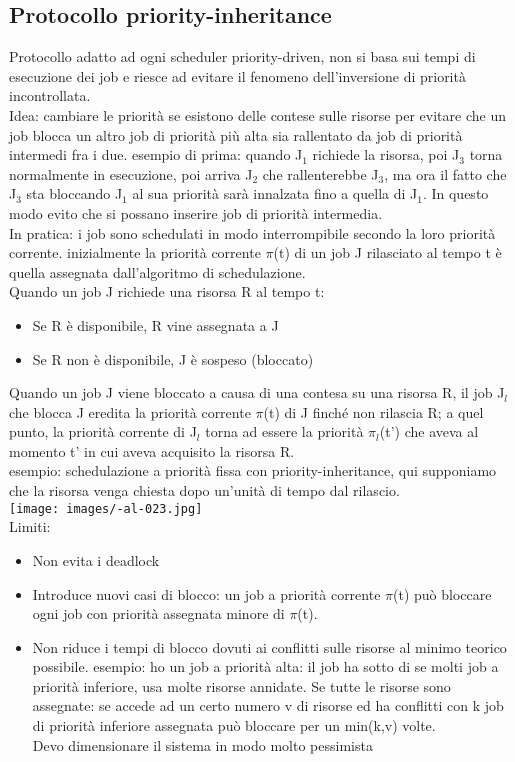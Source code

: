 \documentclass{article}
\begin{document}
\subsection{Protocollo priority-inheritance}
Protocollo adatto ad ogni scheduler priority-driven, non si basa sui tempi di esecuzione dei job e riesce ad evitare il fenomeno dell'inversione di priorità incontrollata.\\ Idea: cambiare le priorità se esistono delle contese sulle risorse per evitare che un job blocca un altro job di priorità più alta sia rallentato da job di priorità intermedi fra i due. esempio di prima: quando J$_{1}$ richiede la risorsa, poi J$_{3}$ torna normalmente in esecuzione, poi arriva J$_{2}$ che rallenterebbe J$_{3}$, ma ora il fatto che J$_{3}$ sta bloccando J$_{1}$ al sua priorità sarà innalzata fino a quella di J$_{1}$. In questo modo evito che si possano inserire job di priorità intermedia.\\ In pratica: i job sono schedulati in modo interrompibile secondo la loro priorità corrente. inizialmente la priorità corrente $\pi$(t) di un job J rilasciato al tempo t è quella assegnata dall'algoritmo di schedulazione.\\ Quando un job J richiede una risorsa R al tempo t:
\begin{itemize}
\item Se R è disponibile, R vine assegnata a J
\item Se R non è disponibile, J è sospeso (bloccato)
\end{itemize}
Quando un job J viene bloccato a causa di una contesa su una risorsa R, il job J$_{l}$ che blocca J eredita la priorità corrente $\pi$(t)  di J finché non rilascia R; a quel punto, la priorità corrente di J$_{l}$ torna ad essere la priorità $\pi_{l}$(t') che aveva al momento t' in cui aveva acquisito la risorsa R.\\ esempio: schedulazione a priorità fissa con priority-inheritance, qui supponiamo che la risorsa venga chiesta dopo un'unità di tempo dal rilascio.\\
\texttt{[image: images/-al-023.jpg]}\\
Limiti:
\begin{itemize}
\item Non evita i deadlock
\item Introduce nuovi casi di blocco: un job a priorità corrente $\pi$(t) può bloccare ogni job con priorità assegnata minore di $\pi$(t).
\item Non riduce i tempi di blocco dovuti ai conflitti sulle risorse al minimo teorico possibile. esempio: ho un job a priorità alta: il job ha sotto di se molti job a priorità inferiore, usa molte risorse annidate. Se tutte le risorse sono assegnate: se accede ad un certo numero v di risorse ed ha conflitti con k job di priorità inferiore assegnata può bloccare per un min(k,v) volte.\\ Devo dimensionare il sistema in modo molto pessimista
\end{itemize}
\end{document}
